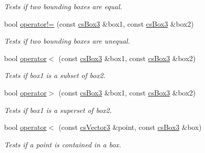 \begin{DoxyCompactItemize}
\begin{DoxyCompactList}\small\item\em Tests if two bounding boxes are equal. \end{DoxyCompactList}\item 
bool \hyperlink{classcsBox3_ae4c5328bb5179aae216fd1af2816abdb}{operator!=} (const \hyperlink{classcsBox3}{cs\+Box3} \&box1, const \hyperlink{classcsBox3}{cs\+Box3} \&box2)\hypertarget{classcsBox3_ae4c5328bb5179aae216fd1af2816abdb}{}\label{classcsBox3_ae4c5328bb5179aae216fd1af2816abdb}

\begin{DoxyCompactList}\small\item\em Tests if two bounding boxes are unequal. \end{DoxyCompactList}\item 
bool \hyperlink{classcsBox3_ad4a3f86a7260aa0f58c63a8b362dfd1a}{operator$<$} (const \hyperlink{classcsBox3}{cs\+Box3} \&box1, const \hyperlink{classcsBox3}{cs\+Box3} \&box2)\hypertarget{classcsBox3_ad4a3f86a7260aa0f58c63a8b362dfd1a}{}\label{classcsBox3_ad4a3f86a7260aa0f58c63a8b362dfd1a}

\begin{DoxyCompactList}\small\item\em Tests if box1 is a subset of box2. \end{DoxyCompactList}\item 
bool \hyperlink{classcsBox3_a800db4b5b562663918a8481d7b41be21}{operator$>$} (const \hyperlink{classcsBox3}{cs\+Box3} \&box1, const \hyperlink{classcsBox3}{cs\+Box3} \&box2)\hypertarget{classcsBox3_a800db4b5b562663918a8481d7b41be21}{}\label{classcsBox3_a800db4b5b562663918a8481d7b41be21}

\begin{DoxyCompactList}\small\item\em Tests if box1 is a superset of box2. \end{DoxyCompactList}\item 
bool \hyperlink{classcsBox3_a54f2ca4591081159072cb78b5e5c43c1}{operator$<$} (const \hyperlink{classcsVector3}{cs\+Vector3} \&point, const \hyperlink{classcsBox3}{cs\+Box3} \&box)\hypertarget{classcsBox3_a54f2ca4591081159072cb78b5e5c43c1}{}\label{classcsBox3_a54f2ca4591081159072cb78b5e5c43c1}

\begin{DoxyCompactList}\small\item\em Tests if a point is contained in a box. \end{DoxyCompactList}\end{DoxyCompactItemize}


